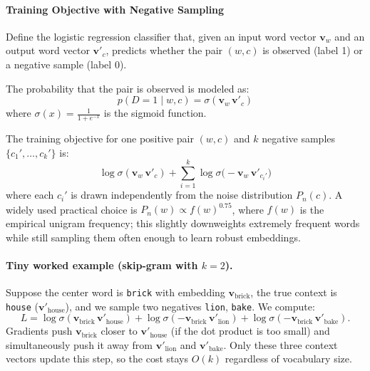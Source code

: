 \paragraph{Training Objective with Negative Sampling}

Define the logistic regression classifier that, given an input word vector \(\mathbf{v}_w\) and an output word vector \(\mathbf{v}'_c\), predicts whether the pair \((w, c)\) is observed (label 1) or a negative sample (label 0).

The probability that the pair is observed is modeled as:
\begin{equation}
    p(D=1 \mid w, c) = \sigma(\mathbf{v}_w\,\mathbf{v}'_c) \label{eq:neg-sample-prob}
\end{equation}
where \(\sigma(x) = \frac{1}{1 + e^{-x}}\) is the sigmoid function.

The training objective for one positive pair \((w, c)\) and \(k\) negative samples \(\{c_1', \ldots, c_k'\}\) is:
\begin{equation}
    \log \sigma(\mathbf{v}_w\,\mathbf{v}'_c) + \sum_{i=1}^k \log \sigma\big(-\mathbf{v}_w\,\mathbf{v}'_{c_i'}\big) \label{eq:neg-sample-loss}
\end{equation}
where each \(c_i'\) is drawn independently from the noise distribution \(P_n(c)\). A widely used practical choice is \(P_n(w)\propto f(w)^{0.75}\), where \(f(w)\) is the empirical unigram frequency; this slightly downweights extremely frequent words while still sampling them often enough to learn robust embeddings.

\paragraph{Tiny worked example (skip-gram with \(k=2\)).} Suppose the center word is \texttt{brick} with embedding \(\mathbf{v}_{\text{brick}}\), the true context is \texttt{house} (\(\mathbf{v}'_{\text{house}}\)), and we sample two negatives \texttt{lion}, \texttt{bake}. We compute:
\[
L = \log\sigma(\mathbf{v}_{\text{brick}}\,\mathbf{v}'_{\text{house}}) + \log\sigma(-\mathbf{v}_{\text{brick}}\,\mathbf{v}'_{\text{lion}}) + \log\sigma(-\mathbf{v}_{\text{brick}}\,\mathbf{v}'_{\text{bake}}).
\]
Gradients push \(\mathbf{v}_{\text{brick}}\) closer to \(\mathbf{v}'_{\text{house}}\) (if the dot product is too small) and simultaneously push it away from \(\mathbf{v}'_{\text{lion}}\) and \(\mathbf{v}'_{\text{bake}}\). Only these three context vectors update this step, so the cost stays \(O(k)\) regardless of vocabulary size.

